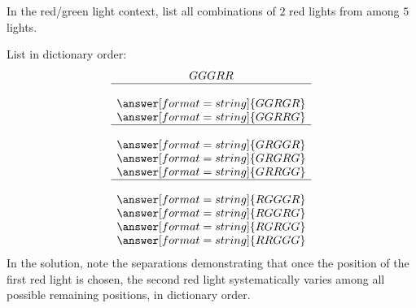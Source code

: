 \documentclass[nooutcomes]{ximera}
\begin{document}
\newpage
\begin{problem}
In the red/green light context, list all combinations of $2$ red lights from among $5$ lights.    
\begin{solution}
List in dictionary order: 
\[
\begin{array}{c}
GGGRR \\ \hline \\
\answer[format=string]{GGRGR} \\
\answer[format=string]{GGRRG} \\ \hline \\
\answer[format=string]{GRGGR} \\
\answer[format=string]{GRGRG} \\
\answer[format=string]{GRRGG} \\ \hline \\
\answer[format=string]{RGGGR} \\
\answer[format=string]{RGGRG} \\
\answer[format=string]{RGRGG} \\
\answer[format=string]{RRGGG}
\end{array}
\]
In the solution, note the separations demonstrating that once the position of the first red light is chosen, the second red light systematically varies among all possible remaining positions, in dictionary order.  
\end{solution}
\end{problem}
\end{document}
